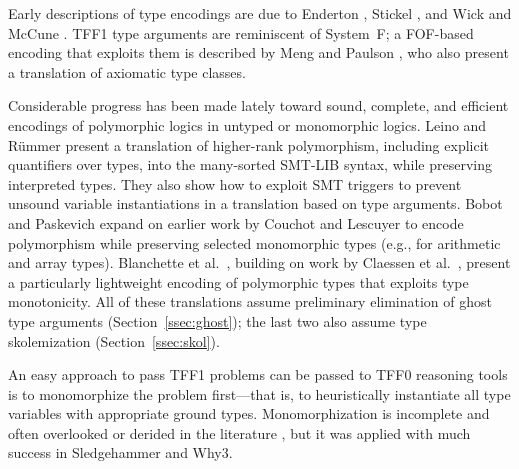 Early descriptions of type encodings are due to Enderton
\cite[\S4.3]{enderton-1972}, Stickel \cite[p.~99]{stickel-1986}, and Wick and
McCune \cite[\S4]{wick-mccune-1989}. TFF1 type arguments are reminiscent of
System~F; a FOF-based encoding that exploits them is described by Meng and
Paulson \cite{meng-paulson-2008-trans}, who also present a translation of
axiomatic type classes.

Considerable progress has been made lately toward sound, complete, and efficient
encodings of polymorphic logics in untyped or monomorphic logics. Leino and
R\"ummer \cite{leino-ruemmer-2010} present a translation of higher-rank
polymorphism, including explicit quantifiers over types, into the many-sorted
SMT-LIB syntax, while preserving interpreted types. They also show how to
exploit SMT triggers to prevent unsound variable instantiations in a
translation based on type arguments. Bobot and Paskevich
\cite{bobot-paskevich-2011} expand on earlier work by Couchot and Lescuyer
\cite{couchot-lescuyer-2007} to encode polymorphism while preserving selected
monomorphic types (e.g., for arithmetic and array types).
Blanchette et
al.\ \cite{blanchette-et-al-2012-mono}, building on work by Claessen et al.\
\cite{claessen-et-al-2011}, present a particularly lightweight encoding of
polymorphic types that exploits type monotonicity. All of these translations
assume preliminary elimination of ghost type arguments
(Section~\ref{ssec:ghost}); the last two also assume type skolemization
(Section~\ref{ssec:skol}).

An easy approach to pass TFF1 problems can be passed to TFF0
reasoning tools is to monomorphize the problem first---that is, to heuristically
instantiate all type variables with appropriate
ground types. Monomorphization is incomplete and often overlooked
or derided in the literature \cite[p.\ 3]{couchot-lescuyer-2007}, but it was
applied with much success in Sledgehammer \cite[\S6]{blanchette-et-al-2012-mono}
and Why3.
